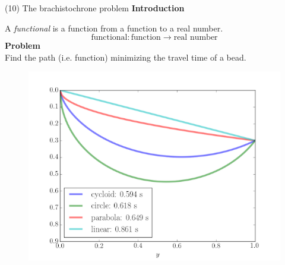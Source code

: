 \documentclass[11pt, aspectratio=149]{beamer}
\theoremstyle{plain}
\begin{document}

\begin{frame}[fragile, t]{(10) The brachistochrone problem}
	\textbf{Introduction}\\ \vspace*{0.5em} 
	
	A \emph{functional} is a function from a function to a real number.
	\begin{equation*}
		\text{functional} : \text{function} \to \text{real number}
	\end{equation*}
	\textbf{Problem} \\
	Find the path (i.e. function) minimizing the travel time of a bead.
	\begin{figure}
		\centering
		\includegraphics[width=0.5\linewidth]{figs/brachistochrone2.png}
	\end{figure}
\end{frame}
\end{document}
